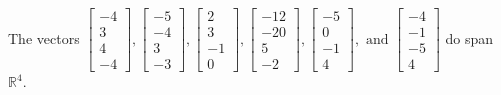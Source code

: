 \begin{exercise}
\begin{exerciseStatement}
  \end{exerciseStatement}
  \begin{exerciseAnswer}
   The vectors \(\left[\begin{array}{r}
-4 \\
3 \\
4 \\
-4
\end{array}\right] , \left[\begin{array}{r}
-5 \\
-4 \\
3 \\
-3
\end{array}\right] , \left[\begin{array}{r}
2 \\
3 \\
-1 \\
0
\end{array}\right] , \left[\begin{array}{r}
-12 \\
-20 \\
5 \\
-2
\end{array}\right] , \left[\begin{array}{r}
-5 \\
0 \\
-1 \\
4
\end{array}\right] , \text{ and } \left[\begin{array}{r}
-4 \\
-1 \\
-5 \\
4
\end{array}\right]\) 
  	 do  
	span \(\mathbb{R}^4\).
  


  \end{exerciseAnswer}
\end{exercise}
